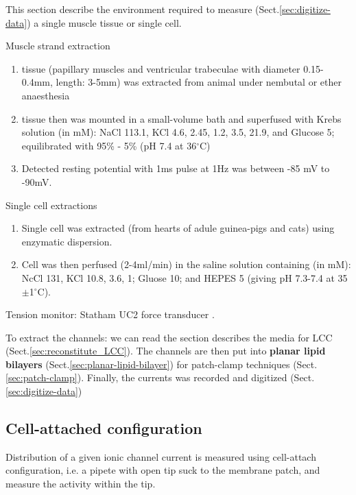 This section describe the environment required to measure
(Sect.\ref{sec:digitize-data}) a single muscle tissue or single cell.

Muscle strand extraction
\begin{enumerate}
  \item tissue (papillary muscles and ventricular trabeculae with diameter
  0.15-0.4mm, length: 3-5mm) was extracted from animal under nembutal or ether
  anaesthesia \citep{mcdonald1989}

  \item tissue then was mounted in a small-volume bath and superfused with Krebs
  solution (in mM): NaCl 113.1, KCl 4.6,  2.45,  1.2,
   3.5,  21.9, and Glucose 5; equilibrated with 95\%
   - 5\%  (pH 7.4 at 36$^\circ$C) \citep{mcdonald1989,
  watanabe1985}

  \item Detected resting potential with 1ms pulse at 1Hz was between -85 mV to
  -90mV. \citep{mcdonald1989}
\end{enumerate}


Single cell extractions
\begin{enumerate}
  \item Single cell was extracted (from hearts of adule guinea-pigs and cats)
  using enzymatic dispersion.
  \item Cell was then perfused (2-4ml/min) in the saline solution containing
  (in mM): NcCl 131, KCl 10.8,  3.6,  1; Gluose 10; and
  HEPES 5 (giving pH 7.3-7.4 at 35$\pm$1$^\circ$C).\citep{mcdonald1989, cavalie1983}
\end{enumerate}

Tension monitor: Statham UC2 force transducer \citep{watanabe1985}.

To extract the channels: we can read the section describes the media for LCC
(Sect.\ref{sec:reconstitute_LCC}). The channels are then put into {\bf planar
lipid bilayers} (Sect.\ref{sec:planar-lipid-bilayer}) for
patch-clamp techniques (Sect.\ref{sec:patch-clamp}).
Finally, the currents was recorded and digitized (Sect.\ref{sec:digitize-data})

\subsection{Cell-attached configuration}
\label{sec:cell-attached-recording}


Distribution of a given ionic channel current is measured using cell-attach
configuration, i.e. a pipete with open tip suck to the membrane patch, and
measure the activity within the tip.



